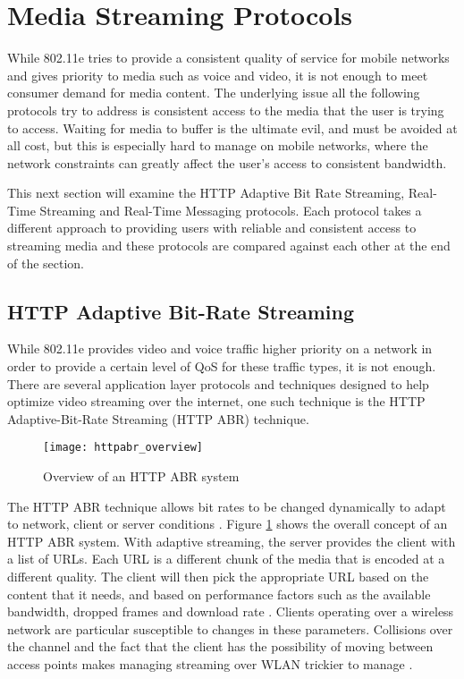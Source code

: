 \documentclass[12pt]{article}
\begin{document}
\section{Media Streaming Protocols}
While 802.11e tries to provide a consistent quality of service for mobile networks and gives priority to media such as voice and video, it is not enough to meet consumer demand for media content.  The underlying issue all the following protocols try to address is consistent access to the media that the user is trying to access.  Waiting for media to buffer is the ultimate evil, and must be avoided at all cost, but this is especially hard to manage on mobile networks, where the network constraints can greatly affect the user's access to consistent bandwidth.

This next section will examine the HTTP Adaptive Bit Rate Streaming, Real-Time Streaming and Real-Time Messaging protocols.  Each protocol takes a different approach to providing users with reliable and consistent access to streaming media and these protocols are compared against each other at the end of the section.

\subsection{HTTP Adaptive Bit-Rate Streaming}
While 802.11e provides video and voice traffic higher priority on a network in order to provide a certain level of QoS for these traffic types, it is not enough.  There are several application layer protocols and techniques designed to help optimize video streaming over the internet, one such technique is the HTTP Adaptive-Bit-Rate Streaming (HTTP ABR) technique.

\begin{figure}[htp]
  \begin{center}
    \texttt{[image: httpabr\_overview]}
    \caption{Overview of an HTTP ABR system}
    \label{fig:httpabr_overview}
  \end{center}
\end{figure}

The HTTP ABR technique allows bit rates to be changed dynamically to adapt to network, client or server conditions \cite{7380453}.  Figure \ref{fig:httpabr_overview} shows the overall concept of an HTTP ABR system. With adaptive streaming, the server provides the client with a list of URLs.  Each URL is a different chunk of the media that is encoded at a different quality.  The client will then pick the appropriate URL based on the content that it needs, and based on performance factors such as the available bandwidth, dropped frames and download rate \cite{httpabrtutorial}\cite{7057917}. Clients operating over a wireless network are particular susceptible to changes in these parameters.  Collisions over the channel and the fact that the client has the possibility of moving between access points makes managing streaming over WLAN trickier to manage \cite{10204452020150501}.
\end{document}
